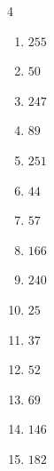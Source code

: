 \begin{multicols}{4}
\begin{enumerate}

  \item $255$


  \item $50$


  \item $247$


  \item $89$


  \item $251$


  \item $44$


  \item $57$


  \item $166$


\columnbreak %

  \item $240$


  \item $25$


  \item $37$


  \item $52$


  \item $69$


  \item $146$


  \item $182$



\end{enumerate}
\end{multicols}
